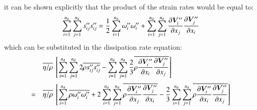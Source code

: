 \documentclass{warpdoc}
\newcommand{\alb}{\vspace{0.2cm}\\} %
\newcommand{\nd}{{{n}_{\rm d}}}
\newcommand{\mfd}{\displaystyle}
\begin{document}
%
%
it can be shown explicitly that
the product of the strain rates would be equal to:
%
\begin{equation}
  \sum_{i=1}^\nd \sum_{j=1}^\nd s_{ij}^{\prime\prime} s_{ij}^{\prime\prime} = 
  \frac{1}{2} \sum_{i=1}^\nd \omega_i^{\prime\prime}  \omega_i^{\prime\prime}
  +\sum_{i=1}^\nd \sum_{j=1}^\nd \frac{\partial \bm{V}_i^{\prime\prime}}{\partial x_j}  \frac{\partial \bm{V}_j^{\prime\prime}}{\partial x_i}
\end{equation}
%
which can be substituted in the dissipation rate equation:
%
\begin{displaymath}
\begin{array}{rl}
   &\mfd\overline{\eta/\rho}~ 
    \left[
      \sum_{i=1}^{\nd} \sum_{j=1}^{\nd}
        2 \overline{ \rho  s_{ij}^{\prime\prime}   s_{ij}^{\prime\prime}}
  -\sum_{i=1}^{\nd} \sum_{j=1}^{\nd}
        \frac{2}{3}  \overline{ \rho  \frac{\partial \bm{V}_i^{\prime\prime}}{\partial x_i}  \frac{\partial \bm{V}_j^{\prime\prime}}{\partial x_j}}
    \right]     \alb
   = & \mfd\overline{\eta/\rho}~ 
    \left[
        \sum_{i=1}^\nd \overline{\rho \omega_i^{\prime\prime} \omega_i^{\prime\prime}}
     +2 \sum_{i=1}^\nd \sum_{j=1}^\nd \overline{\rho \frac{\partial \bm{V}_i^{\prime\prime}}{\partial x_j}  \frac{\partial \bm{V}_j^{\prime\prime}}{\partial x_i}}
     -  \frac{2}{3}  \sum_{i=1}^{\nd} \sum_{j=1}^{\nd}
           \overline{ \rho  \frac{\partial \bm{V}_i^{\prime\prime}}{\partial x_i}  \frac{\partial \bm{V}_j^{\prime\prime}}{\partial x_j}}
    \right]
\end{array}
\end{displaymath}
\end{document}
